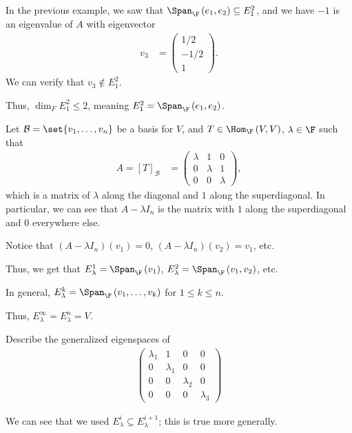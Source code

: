 \documentclass[10pt]{mypackage}
\begin{document}
\begin{example}
  In the previous example, we saw that $\Span_{\F}\left(e_1,e_2\right)\subseteq E_{1}^{2}$, and we have $-1$ is an eigenvalue of $A$ with eigenvector
  \begin{align*}
    v_3 &= \begin{pmatrix}1/2\\-1/2\\1\end{pmatrix}.
  \end{align*}
  We can verify that $v_3 \notin E_{1}^{2}$.\newline

  Thus, $\dim_{F}E_{1}^{2} \leq 2$, meaning $E_{1}^{2} = \Span_{\F}\left(e_1,e_2\right)$.
\end{example}
\begin{example}
  Let $\mathcal{B} = \set{v_1,\dots,v_n}$ be a basis for $V$, and $T\in \Hom_{\F}\left(V,V\right)$, $\lambda \in \F$ such that
  \begin{align*}
    A = \left[T\right]_{\mathcal{B}} &= \begin{pmatrix}\lambda & 1 & 0 \\ 0 & \lambda & 1 \\ 0 & 0 & \lambda\end{pmatrix},
  \end{align*}
  which is a matrix of $\lambda$ along the diagonal and $1$ along the superdiagonal. In particular, we can see that $A - \lambda I_{n}$ is the matrix with $1$ along the superdiagonal and $0$ everywhere else.\newline

  Notice that $\left(A - \lambda I_{n}\right)(v_1) = 0$, $\left(A - \lambda I_{n}\right)\left(v_2\right) = v_1$, etc.\newline

  Thus, we get that $E_{\lambda}^{1} = \Span_{\F}\left(v_1\right)$, $E_{\lambda}^{2} = \Span_{\F}\left(v_1,v_2\right)$, etc.\newline

  In general, $E_{\lambda}^{k} = \Span_{\F}\left(v_1,\dots,v_k\right)$ for $1 \leq k \leq n$.\newline

  Thus, $E_{\lambda}^{\infty} = E_{\lambda}^{n} = V$.
\end{example}
\begin{exercise}
  Describe the generalized eigenspaces of
  \begin{align*}
    \begin{pmatrix}\lambda_1 & 1 & 0 & 0 \\ 0 & \lambda_1 & 0 & 0 \\ 0 & 0 & \lambda_2 & 0 \\ 0 & 0 & 0 & \lambda_3\end{pmatrix}
  \end{align*}
\end{exercise}
We can see that we used $E_{\lambda}^{i} \subseteq E_{\lambda}^{i+1}$; this is true more generally.\newline
\end{document}
